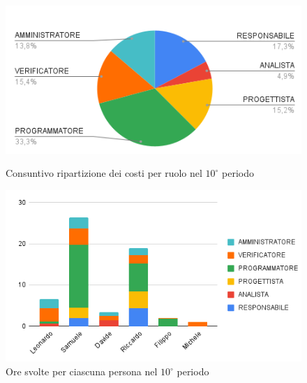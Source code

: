 \begin{figure}[H]
  \centering
  \includegraphics[width=0.6\linewidth]{grafici/10_periodo_torta_consuntivo.png}
  \caption{Consuntivo ripartizione dei costi per ruolo nel $10^\circ$ periodo}
  \includegraphics[width=0.7\linewidth]{grafici/10_periodo_instogramma_consuntivo.png}
  \caption{Ore svolte per ciascuna persona nel $10^\circ$ periodo}
\end{figure}

